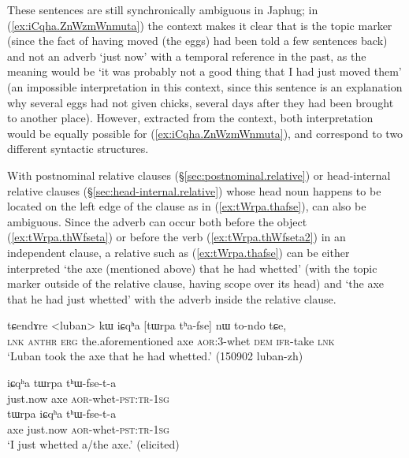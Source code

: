  These sentences are still synchronically ambiguous in Japhug; in  (\ref{ex:iCqha.ZnWzmWnmuta}) the context makes it clear that  is the topic marker (since the fact of having moved (the eggs) had been told a few sentences back) and not an adverb `just now' with a temporal reference in the past, as the meaning would be `it was probably not a good thing that I had just moved them' (an impossible interpretation in this context, since this sentence is an explanation why several eggs had not given chicks, several days after they had been brought to another place). However, extracted from the context, both interpretation would be equally possible for (\ref{ex:iCqha.ZnWzmWnmuta}), and correspond to two different syntactic structures.

With postnominal relative clauses (§\ref{sec:postnominal.relative}) or head-internal relative clauses (§\ref{sec:head-internal.relative}) whose head noun happens to be located on the left edge of the clause as in (\ref{ex:tWrpa.thafse}),  can also be ambiguous. Since the adverb  can occur both before the object (\ref{ex:tWrpa.thWfseta}) or before the verb (\ref{ex:tWrpa.thWfseta2}) in an independent clause, a relative such as (\ref{ex:tWrpa.thafse}) can be either interpreted `the axe (mentioned above) that he had whetted' (with the topic marker  outside of the relative clause, having scope over its head) and `the axe that he had just whetted' with the adverb  inside the relative clause.

 \begin{exe}
\ex \label{ex:tWrpa.thafse}
 \gll  tɕendɤre <luban> kɯ iɕqʰa [tɯrpa tʰa-fse] nɯ to-ndo tɕe, \\
 \textsc{lnk}  \textsc{anthr} \textsc{erg} the.aforementioned axe \textsc{aor}:3\flobv{}-whet \textsc{dem} \textsc{ifr}-take \textsc{lnk} \\
 \glt `Luban took the axe that he had whetted.' (150902 luban-zh)
 \end{exe}

  \begin{exe}
  \ex 
  \begin{xlist}
\ex \label{ex:tWrpa.thWfseta}
 \gll   iɕqʰa tɯrpa tʰɯ-fse-t-a \\
just.now axe \textsc{aor}-whet-\textsc{pst}:\textsc{tr}-\textsc{1sg} \\
\ex \label{ex:tWrpa.thWfseta2}
 \gll   tɯrpa  iɕqʰa tʰɯ-fse-t-a \\
 axe just.now \textsc{aor}-whet-\textsc{pst}:\textsc{tr}-\textsc{1sg} \\
 \glt `I just whetted a/the axe.' (elicited)
 \end{xlist}
 \end{exe}

